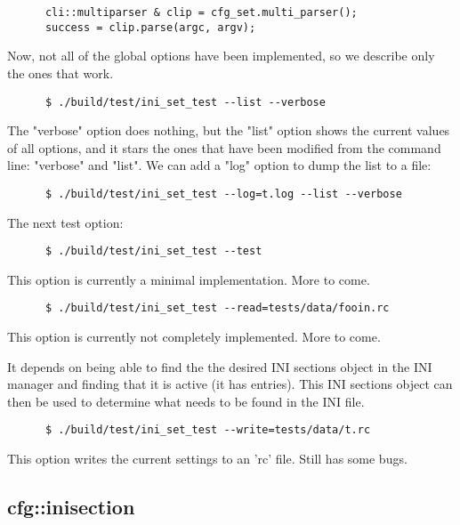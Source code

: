   \begin{verbatim}
      cli::multiparser & clip = cfg_set.multi_parser();
      success = clip.parse(argc, argv);
   \end{verbatim}

   Now, not all of the global options have been implemented, so we describe
   only the ones that work.

   \begin{verbatim}
      $ ./build/test/ini_set_test --list --verbose
   \end{verbatim}

   The "verbose" option does nothing, but the "list" option shows
   the current values of all options, and it stars the ones that
   have been modified from the command line: "verbose" and "list".
   We can add a "log" option to dump the list to a file:

   \begin{verbatim}
      $ ./build/test/ini_set_test --log=t.log --list --verbose
   \end{verbatim}

   The next test option:

   \begin{verbatim}
      $ ./build/test/ini_set_test --test
   \end{verbatim}

   This option is currently a minimal implementation. More to come.

   \begin{verbatim}
      $ ./build/test/ini_set_test --read=tests/data/fooin.rc
   \end{verbatim}

   This option is currently not completely implemented. More to come.

   It depends on being able to find the the desired INI sections object in the
   INI manager and finding that it is active (it has entries).
   This INI sections object can then be used to determine what needs to
   be found in the INI file.

   \begin{verbatim}
      $ ./build/test/ini_set_test --write=tests/data/t.rc
   \end{verbatim}

   This option writes the current settings to an 'rc' file.
   Still has some bugs.

\subsection{cfg::inisection}
\label{subsec:cfg_namespace_inisection}

